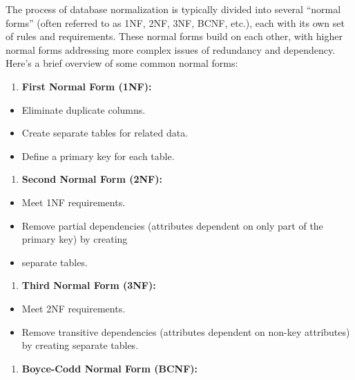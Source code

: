 \documentclass[
]{book}
\providecommand{\tightlist}{%
  \setlength{\itemsep}{0pt}\setlength{\parskip}{0pt}}
\begin{document}
The process of database normalization is typically divided into several ``normal forms'' (often referred to as 1NF, 2NF, 3NF, BCNF, etc.), each with its own set of rules and requirements. These normal forms build on each other, with higher normal forms addressing more complex issues of redundancy and dependency. Here's a brief overview of some common normal forms:

\begin{enumerate}
\def\labelenumi{\arabic{enumi}.}
\tightlist
\item
  \textbf{First Normal Form (1NF):}
\end{enumerate}

\begin{itemize}
\tightlist
\item
  Eliminate duplicate columns.
\item
  Create separate tables for related data.
\item
  Define a primary key for each table.
\end{itemize}

\begin{enumerate}
\def\labelenumi{\arabic{enumi}.}
\setcounter{enumi}{1}
\tightlist
\item
  \textbf{Second Normal Form (2NF):}
\end{enumerate}

\begin{itemize}
\tightlist
\item
  Meet 1NF requirements.
\item
  Remove partial dependencies (attributes dependent on only part of the primary key) by creating
\item
  separate tables.
\end{itemize}

\begin{enumerate}
\def\labelenumi{\arabic{enumi}.}
\setcounter{enumi}{2}
\tightlist
\item
  \textbf{Third Normal Form (3NF):}
\end{enumerate}

\begin{itemize}
\tightlist
\item
  Meet 2NF requirements.
\item
  Remove transitive dependencies (attributes dependent on non-key attributes) by creating separate tables.
\end{itemize}

\begin{enumerate}
\def\labelenumi{\arabic{enumi}.}
\setcounter{enumi}{3}
\tightlist
\item
  \textbf{Boyce-Codd Normal Form (BCNF):}
\end{enumerate}
\end{document}
